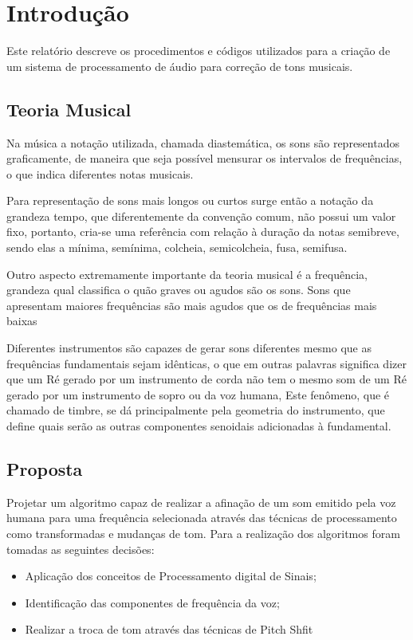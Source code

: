
\chapter*[Introdução]{Introdução}

Este relatório descreve os procedimentos e códigos utilizados para a criação de um sistema de processamento de áudio para correção de tons musicais.

\section*{Teoria Musical}
Na música a notação utilizada, chamada diastemática, os sons são representados graficamente, de maneira que seja possível mensurar os intervalos de frequências, o que indica diferentes notas musicais. 

Para representação de sons mais longos ou curtos surge então a notação da grandeza tempo, que diferentemente da convenção comum, não possui um valor fixo, portanto, cria-se uma referência com relação à duração da notas semibreve, sendo elas a mínima, semínima, colcheia, semicolcheia, fusa, semifusa.

Outro aspecto extremamente importante da teoria musical é a frequência, grandeza qual classifica o quão graves ou agudos são os sons. Sons que apresentam maiores frequências são mais agudos que os de frequências mais baixas 

Diferentes instrumentos são capazes de gerar sons diferentes mesmo que as frequências fundamentais sejam idênticas, o que em outras palavras significa dizer que um Ré gerado por um instrumento de corda não tem o mesmo som de um Ré gerado por um instrumento de sopro ou da voz humana, Este fenômeno, que é chamado de timbre, se dá principalmente pela geometria do instrumento, que define quais serão as outras componentes senoidais adicionadas à fundamental.



\section*{Proposta}\label{sec:motivacao}

Projetar um algoritmo capaz de realizar a afinação de um som emitido pela voz humana para uma frequência selecionada através das técnicas de processamento como transformadas e mudanças de tom. Para a realização dos algoritmos foram tomadas as seguintes decisões:

\begin{itemize}
\item Aplicação dos conceitos de Processamento digital de Sinais;
\item Identificação das componentes de frequência da voz;
\item Realizar a troca de tom através das técnicas de Pitch Shfit
\end{itemize}

